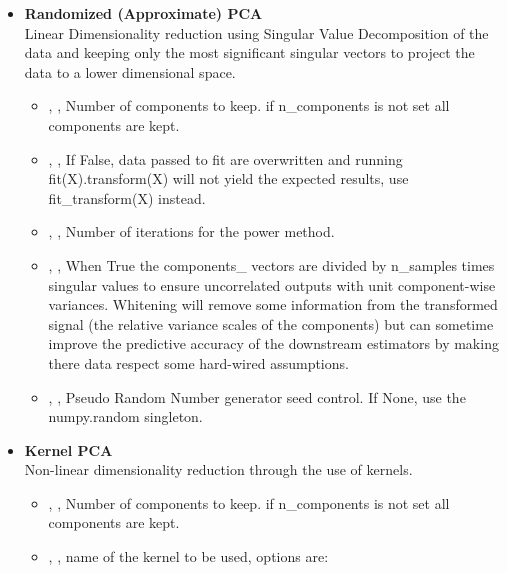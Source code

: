 \begin{itemize}
	\item \textbf{Randomized {(Approximate)} PCA} \\
	Linear Dimensionality reduction using Singular Value Decomposition of the data
	and keeping only the most significant singular vectors to project the data to a
	 lower dimensional space.
	\begin{itemize}
		\item {}, , Number of components to keep. if n\_components is
		not set all components are kept.
		\item {}, , If False,
		 data passed to fit are overwritten and running fit(X).transform(X)
 		will not yield the expected results, use fit\_transform(X) instead.
		\item {}, ,
		Number of iterations for the power method. 
		\item {}, , When True
		the components\_ vectors are divided by n\_samples times singular
		 values to ensure uncorrelated outputs with unit component-wise
		variances. Whitening will remove some information from the transformed
		 signal (the relative variance scales of the components) but can
		sometime improve the predictive accuracy of the downstream estimators
		 by making there data respect some hard-wired assumptions. 
		\item {}, , Pseudo Random Number generator seed control.
		 If None, use the numpy.random singleton. 
	\end{itemize}
	\item \textbf{Kernel PCA} \\
	Non-linear dimensionality reduction through the use of kernels.
	\begin{itemize}
		\item {}, , Number of components to keep. if n\_components is
		not set all components are kept.
		\item {}, , name of
		the kernel to be used, options are:
		\begin{itemize}

\end{itemize}
\end{itemize}
\end{itemize}
